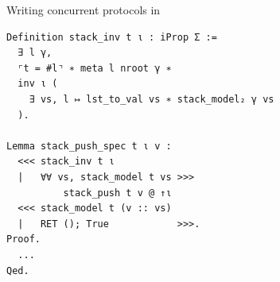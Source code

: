 \begin{frame}[fragile]{Writing concurrent protocols in \Iris}
\small
\begin{verbatim}
Definition stack_inv t ι : iProp Σ :=
  ∃ l γ,
  ⌜t = #l⌝ ∗ meta l nroot γ ∗
  inv ι (
    ∃ vs, l ↦ lst_to_val vs ∗ stack_model₂ γ vs
  ).

Lemma stack_push_spec t ι v :
  <<< stack_inv t ι
  |   ∀∀ vs, stack_model t vs >>>
          stack_push t v @ ↑ι
  <<< stack_model t (v :: vs)
  |   RET (); True            >>>.
Proof.
  ...
Qed.
\end{verbatim}
\end{frame}